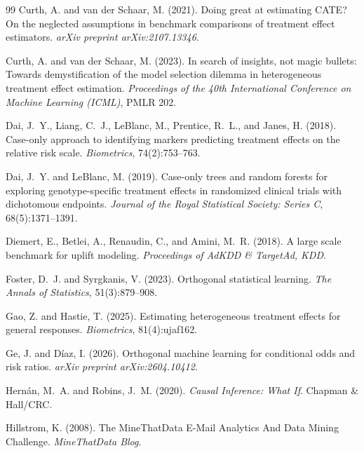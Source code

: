 \documentclass{article}
\begin{document}
\begin{thebibliography}{99}
Curth, A. and van der Schaar, M. (2021).
Doing great at estimating CATE? On the neglected assumptions in benchmark comparisons of treatment effect estimators.
\emph{arXiv preprint arXiv:2107.13346}.

Curth, A. and van der Schaar, M. (2023).
In search of insights, not magic bullets: Towards demystification of the model selection dilemma in heterogeneous treatment effect estimation.
\emph{Proceedings of the 40th International Conference on Machine Learning (ICML)}, PMLR 202.

Dai, J.~Y., Liang, C.~J., LeBlanc, M., Prentice, R.~L., and Janes, H. (2018).
Case-only approach to identifying markers predicting treatment effects on the relative risk scale.
\emph{Biometrics}, 74(2):753--763.

Dai, J.~Y. and LeBlanc, M. (2019).
Case-only trees and random forests for exploring genotype-specific treatment effects in randomized clinical trials with dichotomous endpoints.
\emph{Journal of the Royal Statistical Society: Series C}, 68(5):1371--1391.

Diemert, E., Betlei, A., Renaudin, C., and Amini, M.~R. (2018).
A large scale benchmark for uplift modeling.
\emph{Proceedings of AdKDD \& TargetAd, KDD}.

Foster, D.~J. and Syrgkanis, V. (2023).
Orthogonal statistical learning.
\emph{The Annals of Statistics}, 51(3):879--908.

Gao, Z. and Hastie, T. (2025).
Estimating heterogeneous treatment effects for general responses.
\emph{Biometrics}, 81(4):ujaf162.

Ge, J. and D{\'i}az, I. (2026).
Orthogonal machine learning for conditional odds and risk ratios.
\emph{arXiv preprint arXiv:2604.10412}.

Hern{\'a}n, M.~A. and Robins, J.~M. (2020).
\emph{Causal Inference: What If}.
Chapman \& Hall/CRC.

Hillstrom, K. (2008).
The MineThatData E-Mail Analytics And Data Mining Challenge.
\emph{MineThatData Blog}.


\end{thebibliography}
\end{document}
